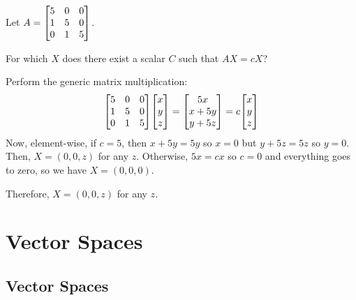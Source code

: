 \documentclass[notes]{agony}
\begin{document}
\begin{xca}
  Let $A = \mqty[5&0&0 \\ 1&5&0 \\ 0&1&5]$.

  For which $X$ does there exist a scalar $C$ such that $AX = cX$?
\end{xca}
\begin{sol}
  Perform the generic matrix multiplication:
  \[
    \mqty[5&0&0 \\ 1&5&0 \\ 0&1&5] \mqty[x \\ y \\ z]
    = \mqty[5x \\ x+5y \\ y+5z] = c\mqty[x \\ y \\ z]
  \]
  Now, element-wise, if $c = 5$, then $x+5y=5y$ so $x=0$ but $y+5z=5z$ so $y=0$.
  Then, $X = (0,0,z)$ for any $z$.
  Otherwise, $5x = cx$ so $c=0$ and everything goes to zero, so we have $X=(0,0,0)$.

  Therefore, $X = (0,0,z)$ for any $z$.
\end{sol}

\chapter{Vector Spaces}

\section{Vector Spaces}
\end{document}
